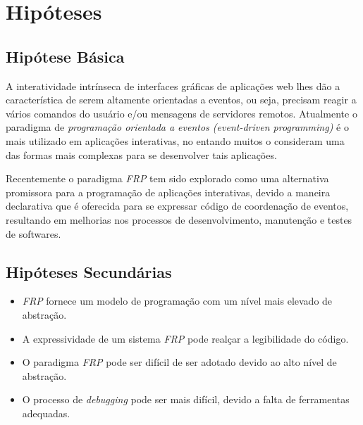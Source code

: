 \section{Hipóteses}\label{lhipoteses}


\subsection{Hipótese Básica}

A interatividade intrínseca de interfaces gráficas de
aplicações web lhes dão a característica de serem altamente
orientadas a eventos,
ou seja, precisam reagir a vários comandos do usuário e/ou
mensagens de servidores remotos.
Atualmente o paradigma de \emph{programação orientada a
eventos (event-driven programming)} é o mais utilizado em
aplicações interativas, no entando muitos o consideram uma
das formas mais complexas para se desenvolver tais aplicações.

Recentemente o paradigma \emph{FRP} tem sido explorado como
uma alternativa promissora para a programação de aplicações
interativas, devido a maneira declarativa que é oferecida
para se expressar código de coordenação de eventos,
resultando em melhorias nos processos de desenvolvimento,
manutenção e testes de softwares.


\subsection{Hipóteses Secundárias}

\begin{itemize}[noitemsep]
  \item \emph{FRP} fornece um modelo de programação com um
        nível mais elevado de abstração.
  \item A expressividade de um sistema \emph{FRP} pode
        realçar a legibilidade do código.
  \item O paradigma \emph{FRP} pode ser difícil de ser adotado
        devido ao alto nível de abstração.
  \item O processo de \emph{debugging} pode ser mais difícil,
        devido a falta de ferramentas adequadas.
\end{itemize}


